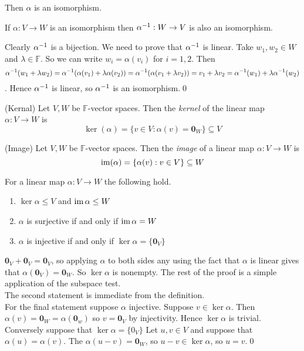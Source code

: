 \documentclass{article}
\newcommand{\F}{\mathbb{F}}
\begin{document}
Then $ \alpha $ is an isomorphism.
\begin{proposition}
  If $ \alpha: V\to W $ is an isomorphism then $ {\alpha}^{-1}:W\to V $ is also an isomorphism.
\end{proposition}
\pf Clearly $ {\alpha}^{-1} $ is a bijection. We need to prove that $ {\alpha}^{-1} $ is linear. Take $ w_1,w_2\in W $ and $ \lambda\in \F $. So we can write $ w_i=\alpha(v_i) $ for $ i=1,2 $. Then \[ {\alpha}^{-1}(w_1+\lambda w_2)={\alpha}^{-1}(\alpha(v_1)+\lambda\alpha(v_2))={\alpha}^{-1}(\alpha(v_1+\lambda v_2))=v_1+\lambda v_2={\alpha}^{-1}(w_1)+\lambda{\alpha}^{-1}(w_2) \]. Hence $ {\alpha}^{-1} $ is linear, so $ {\alpha}^{-1} $ is an isomorphism.\qed 
\begin{definition}
	(Kernal) Let $ V,W $ be $ \F $-vector spaces. Then the \textit{kernel} of the linear map $ \alpha:V\to W $ is
	\[
		\ker(\alpha)=\{v\in V:\alpha(v)=\mathbf 0_W\}\subseteq V
	\]
\end{definition}
\begin{definition}
	(Image) Let $ V,W $ be $ \F $-vector spaces. Then the \textit{image} of a linear map $ \alpha:V\to W $ is
	\[
		\operatorname{im}(\alpha)=\{\alpha(v):v\in V\}\subseteq W
	\]
\end{definition}
\begin{lemma}
  For a linear map $ \alpha:V\to W $ the following hold.
  \begin{enumerate}
	  \item $ \ker\alpha\le V $ and $ \operatorname{im} \alpha \le W $
	  \item $ \alpha $ is surjective if and only if $ \operatorname{im} \alpha =W $
	  \item $ \alpha $ is injective if and only if $ \ker\alpha=\{\mathbf 0_V\} $
  \end{enumerate}
\end{lemma}
\pf $ \mathbf 0_V+\mathbf 0_V=\mathbf 0_V $, so applying $ \alpha $ to both sides any using the fact that $ \alpha $ is linear gives that $ \alpha(\mathbf 0_V)=\mathbf 0_W $. So $ \ker\alpha $ is nonempty. The rest of the proof is a simple application of the subspace test.\\
The second statement is immediate from the definition.\\
For the final statement suppose $ \alpha $ injective. Suppose $ v\in \ker \alpha $. Then $ \alpha(v)=\mathbf 0_W=\alpha(\mathbf 0_w) $ so $ v=\mathbf 0_V $ by injectivity. Hence $ \ker\alpha $ is trivial.
Conversely suppose that $ \ker \alpha=\{0_V\} $ Let $ u,v\in V $ and suppose that $ \alpha(u)=\alpha(v) $. The $ \alpha(u-v)=\mathbf 0_W $, so $ u-v\in\ker\alpha $, so $ u=v $.\qed\par
\end{document}
